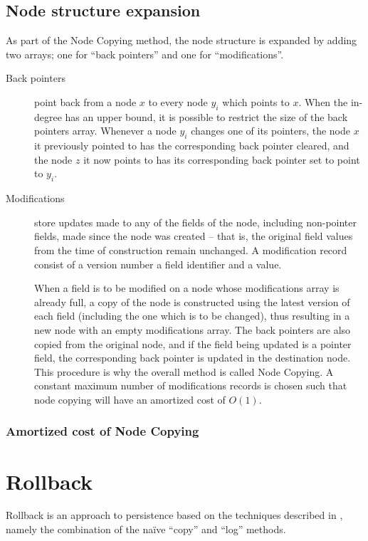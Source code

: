 \subsection{Node structure expansion}
As part of the Node Copying method, the node structure is expanded by adding two
arrays; one for ``back pointers'' and one for ``modifications''.

\begin{description}
  \item[Back pointers] 

  point back from a node $x$ to every node $y_i$ which points to $x$. When the
  in-degree has an upper bound, it is possible to restrict the size of the back
  pointers array. Whenever a node $y_i$ changes one of its pointers, the node
  $x$ it previously pointed to has the corresponding back pointer cleared, and
  the node $z$ it now points to has its corresponding back pointer set to point
  to $y_i$.

  \item[Modifications] store updates made to any of the fields of the node,
  including non-pointer fields, made since the node was created -- that is, the
  original field values from the time of construction remain unchanged. A
  modification record consist of a version number a field identifier and a
  value.

  When a field is to be modified on a node whose modifications array is already
  full, a copy of the node is constructed using the latest version of each field
  (including the one which is to be changed), thus resulting in a new node with
  an empty modifications array. The back pointers are also copied from the
  original node, and if the field being updated is a pointer field, the
  corresponding back pointer is updated in the destination node. This procedure
  is why the overall method is called Node Copying. A constant maximum number of
  modifications records is chosen such that node copying will have an amortized
  cost of $O(1)$.
\end{description}

\subsubsection{Amortized cost of Node Copying}

\section{Rollback}
Rollback is an approach to persistence based on the techniques described in
\cite{Tsotras1995237}, namely the combination of the na\"ive ``copy'' and
``log'' methods.
